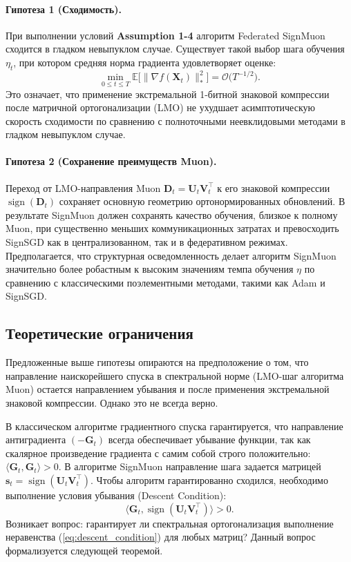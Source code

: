 \documentclass{article}
\begin{document}
\paragraph{Гипотеза 1 (Сходимость).} При выполнении условий \textbf{Assumption 1-4} алгоритм Federated SignMuon сходится в гладком невыпуклом случае. Существует такой выбор шага обучения $\eta_t$, при котором средняя норма градиента удовлетворяет оценке:
\begin{equation}
\min_{0 \le t \le T}\mathbb{E}\bigl[\|\nabla f(\mathbf{X}_t)\|_*^2\bigr] = \mathcal{O}\bigl(T^{-1/2}\bigr).
\end{equation}
Это означает, что применение экстремальной 1-битной знаковой компрессии после матричной ортогонализации (LMO) не ухудшает асимптотическую скорость сходимости по сравнению с полноточными неевклидовыми методами в гладком невыпуклом случае.

\paragraph{Гипотеза 2 (Сохранение преимуществ Muon).}
Переход от LMO-направления Muon $\mathbf{D}_t=\mathbf{U}_t\mathbf{V}_t^\top$ к его знаковой компрессии $\operatorname{sign}(\mathbf{D}_t)$ сохраняет основную геометрию ортонормированных обновлений. В результате SignMuon должен сохранять качество обучения, близкое к полному Muon, при существенно меньших коммуникационных затратах и превосходить SignSGD как в централизованном, так и в федеративном режимах. Предполагается, что структурная осведомленность делает алгоритм SignMuon значительно более робастным к высоким значениям темпа обучения $\eta$ по сравнению с классическими поэлементными методами, такими как Adam и SignSGD. 

\subsection{Теоретические ограничения}
Предложенные выше гипотезы опираются на предположение о том, что направление наискорейшего спуска в спектральной норме (LMO-шаг алгоритма Muon) остается направлением убывания и после применения экстремальной знаковой компрессии. Однако это не всегда верно. 

В классическом алгоритме градиентного спуска гарантируется, что направление антиградиента $(-\mathbf{G}_t)$ всегда обеспечивает убывание функции, так как скалярное произведение градиента с самим собой строго положительно: $\langle \mathbf{G}_t, \mathbf{G}_t \rangle > 0$. В алгоритме SignMuon направление шага задается матрицей $\mathbf{s}_t = \operatorname{sign}(\mathbf{U}_t \mathbf{V}_t^\top)$. Чтобы алгоритм гарантированно сходился, необходимо выполнение условия убывания (Descent Condition):
\begin{equation}
\langle \mathbf{G}_t, \operatorname{sign}(\mathbf{U}_t \mathbf{V}_t^\top) \rangle > 0.
\label{eq:descent_condition}
\end{equation}
Возникает вопрос: гарантирует ли спектральная ортогонализация выполнение неравенства (\ref{eq:descent_condition}) для любых матриц? Данный вопрос формализуется следующей теоремой. 
\end{document}
